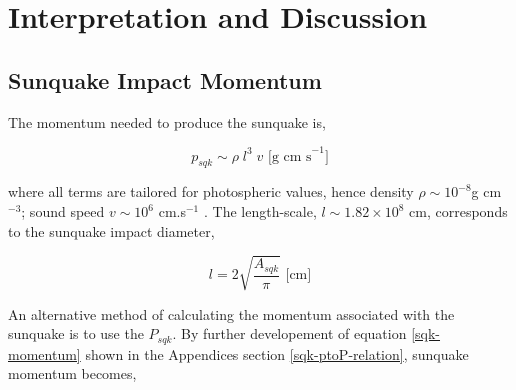 \section{Interpretation and Discussion}
\subsection{Sunquake Impact Momentum}
The momentum needed to produce the sunquake is,

\begin{equation}\label{sqk-momentum} 
p_{sqk}\sim \rho \; l^{3} \; v \text{ [g cm s}^{-1}]
\end{equation}

\noindent
where all terms are tailored for photospheric values, hence density $\rho \sim 10^{-8}$g cm$^{-3}$; sound speed $v \sim 10^{6}$ cm.s$^{-1}$ \citep{2015ApJ...807..102S}. The length-scale, $l \sim  1.82{\times}10^{8}$ cm, corresponds to the sunquake impact diameter, 

\begin{equation}\label{lengthscale}
l = 2\sqrt{\frac{A_{sqk}}{\pi}} \text{ [cm]}
\end{equation}

\noindent
An alternative method of calculating the momentum associated with the sunquake is to use the $P_{sqk}$. By further developement of equation \ref{sqk-momentum} shown in the Appendices section \ref{sqk-ptoP-relation}, sunquake momentum becomes,  

